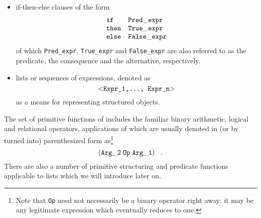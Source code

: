 \begin{itemize}
\item {\sc if-then-else} {\mys clauses} of the form
$$\begin{array}{ll}
{\tt if} & {\tt Pred\_expr}\\
{\tt then} & {\tt True\_expr}\\
{\tt else} & {\tt False\_expr}
\end{array} $$
of which {\tt Pred\_expr}, {\tt True\_expr} and {\tt False\_expr} are
also referred to as the {\mys predicate}, the {\mys consequence} and
the {\mys alternative}, respectively.
\item {\mys lists} or {\mys sequences of
expressions}, denoted as
$$
\mbox{{\tt $<$Expr\_1,\ldots, Expr\_n$>$}}
$$
as a means for representing {\mys structured objects}.

\end{itemize}

\sloppy %
The set of {\mys primitive functions} of \kir includes
the familiar binary {\mys arithmetic}, {\mys logical} and {\mys relational
operators}, applications of which are usually denoted in (or by \pired
turned into)
parenthesized form as\footnote{Note that {\tt Op} need not necessarily
be a binary operator right away: it may be any legitimate \kir expression which eventually reduces to one.}
$$
{{\tt (Arg\_2}\;{\tt Op}\; {\tt Arg\_1)}}\;\;\;.
$$
There are also a number of primitive
structuring and predicate functions applicable to lists which
we will introduce later on.
 
